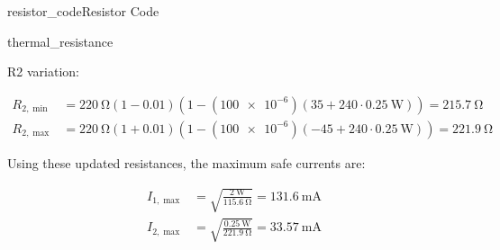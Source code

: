 \begin{mainquestion}{resistor_code}{Resistor Code}
\begin{partquestion}{thermal_resistance}
\begin{answer}
R2 variation:

\begin{align*}
R_{2,\min} &=
\qty{220}{\ohm}\left(1-\num{0.01}\right)
\left(1-(\num{100e-6})\left(35 + 240\cdot \qty{0.25}{\watt}\right)\right)
= \qty{215.7}{\ohm} \\
R_{2,\max} &=
\qty{220}{\ohm}\left(1+\num{0.01}\right)
\left(1-(\num{100e-6})\left(-45 + 240\cdot \qty{0.25}{\watt}\right)\right)
= \qty{221.9}{\ohm}
\end{align*}

Using these updated resistances, the maximum safe currents are:

\begin{align*}
I_{1,\max} &= \sqrt{\frac{\qty{2}{\watt}}{\qty{115.6}{\ohm}}}
= \qty{131.6}{\milli\ampere} \\
I_{2,\max} &= \sqrt{\frac{\qty{0.25}{\watt}}{\qty{221.9}{\ohm}}}
= \qty{33.57}{\milli\ampere}
\end{align*}

\end{answer}
\end{partquestion}

\end{mainquestion}